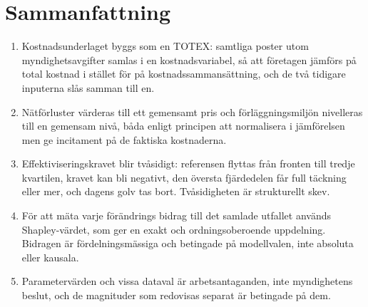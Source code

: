 \documentclass[11pt,a4paper]{article}
\begin{document}
\section{Sammanfattning}

\begin{enumerate}
  \item Kostnadsunderlaget byggs som en TOTEX: samtliga poster utom myndighetsavgifter samlas i en
    kostnadsvariabel, så att företagen jämförs på total kostnad i stället för på
    kostnadssammansättning, och de två tidigare inputerna slås samman till en.
  \item Nätförluster värderas till ett gemensamt pris och förläggningsmiljön nivelleras till en
    gemensam nivå, båda enligt principen att normalisera i jämförelsen men ge incitament på de
    faktiska kostnaderna.
  \item Effektiviseringskravet blir tvåsidigt: referensen flyttas från fronten till tredje
    kvartilen, kravet kan bli negativt, den översta fjärdedelen får full täckning eller mer, och
    dagens golv tas bort. Tvåsidigheten är strukturellt skev.
  \item För att mäta varje förändrings bidrag till det samlade utfallet används Shapley-värdet, som
    ger en exakt och ordningsoberoende uppdelning. Bidragen är fördelningsmässiga och betingade på
    modellvalen, inte absoluta eller kausala.
  \item Parametervärden och vissa dataval är arbetsantaganden, inte myndighetens beslut, och de
    magnituder som redovisas separat är betingade på dem.
\end{enumerate}
\end{document}
